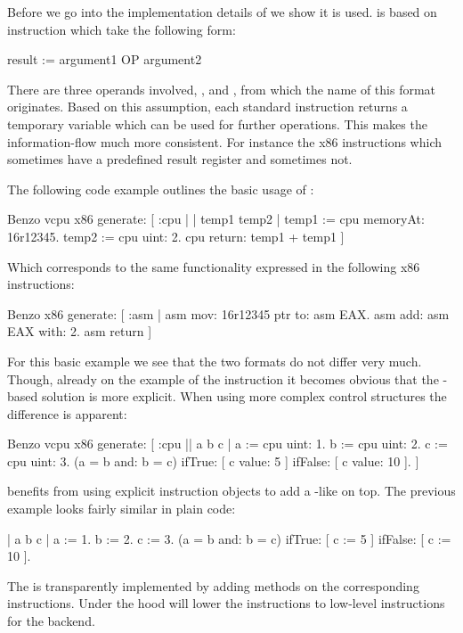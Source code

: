 Before we go into the implementation details of \VCPU we show it is used.
\VCPU is based on \TAC instruction which take the following form:
%
\begin{stcode}{}
result := argument1 OP argument2
\end{stcode}
%
There are three operands involved, ,  and , from which the name of this \TAC format originates.
Based on this assumption, each standard \VCPU instruction returns a temporary variable which can be used for further operations.
This makes the information-flow much more consistent.
For instance the x86 instructions which sometimes have a predefined result register and sometimes not.

The following code example outlines the basic usage of \VCPU:
%
\begin{stcode}[
	label={lst:benzo-problem-vcpu}, 
	caption={Basic \VCPU Example}
]{}
Benzo vcpu x86 generate: [ :cpu | | temp1 temp2 |
	temp1 := cpu memoryAt: 16r12345.
	temp2 := cpu uint: 2.
	cpu return: temp1 + temp1 ]
\end{stcode}
%
Which corresponds to the same functionality expressed in the following x86 instructions:
%
\begin{stcode}{}
Benzo x86 generate: [ :asm |
	asm mov: 16r12345 ptr to: asm EAX.
	asm add: asm EAX with: 2.
	asm return ]
\end{stcode}
%
For this basic example we see that the two formats do not differ very much.
Though, already on the example of the  instruction it becomes obvious that the \TAC-based solution is more explicit.
When using more complex control structures the difference is apparent:
\begin{stcode}{}
Benzo vcpu x86 generate: [ :cpu || a b c |
	a := cpu uint: 1.
	b := cpu uint: 2.
	c := cpu uint: 3.
	(a = b and: b = c) 
		ifTrue:  [ c value: 5  ] 
		ifFalse: [ c value: 10 ].
]
\end{stcode}
%
\VCPU benefits from using explicit instruction objects to add a \PH-like \DSL on top.
The previous example looks fairly similar in plain \PH code:
%
\begin{stcode}{}
| a b c |
a := 1.
b := 2.
c := 3.
(a = b and: b = c) 
	ifTrue:  [ c := 5  ] 
	ifFalse: [ c := 10 ].
\end{stcode}
%
The \DSL is transparently implemented by adding \PH methods on the corresponding \VCPU instructions.
Under the hood \VCPU will lower the \TAC instructions to low-level \ASM instructions for the \AsmJIT backend.


